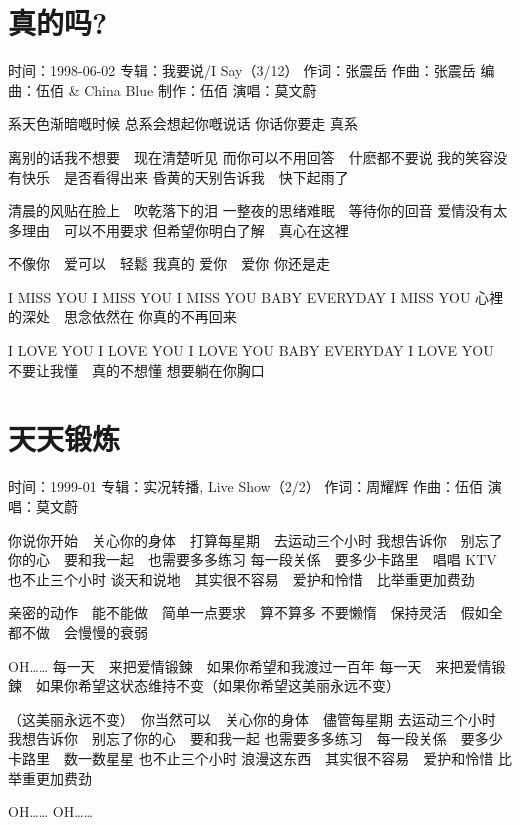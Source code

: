 \documentclass[UTF8,a4paper,oneside,twocolumn,12pt]{ctexbook}
\newcommand{\infopair}[2]{\textbullet #1：#2}
\newcommand{\zc}[1][伍佰]{\infopair{作词}{#1}}
\newcommand{\zq}[1][伍佰]{\infopair{作曲}{#1}}
\newcommand{\bq}[1][伍佰]{\infopair{编曲}{#1}}
\newcommand{\zj}[1]{\infopair{专辑}{#1}}
\newcommand{\zz}[1]{\infopair{制作}{#1}}
\newcommand{\sj}[1]{\infopair{时间}{#1}}
\newenvironment{info}{\begin{flushleft}\kaishu
	}
	{\end{flushleft}\normalsize\yahei\par}
\newenvironment{lyric}{
	}
{}
\begin{document}
\section{真的吗?}
\begin{info}
	\sj{1998-06-02}
	\zj{我要说/I Say（3/12）}
	\zc[张震岳]
	\zq[张震岳]
	\bq[伍佰 \& China Blue]
	\zz{伍佰}
	\infopair{演唱}{莫文蔚}
\end{info}
\begin{lyric}
	系天色渐暗嘅时候 总系会想起你嘅说话
	你话你要走 真系

	离别的话我不想要　现在清楚听见
	而你可以不用回答　什麽都不要说
	我的笑容没有快乐　是否看得出来
	昏黄的天别告诉我　快下起雨了

	清晨的风贴在脸上　吹乾落下的泪
	一整夜的思绪难眠　等待你的回音
	爱情没有太多理由　可以不用要求
	但希望你明白了解　真心在这裡

	不像你　爱可以　轻鬆
	我真的 爱你　爱你  你还是走

	I MISS YOU  I MISS YOU  I MISS YOU
	BABY EVERYDAY I MISS YOU
	心裡的深处　思念依然在  你真的不再回来

	I LOVE YOU  I LOVE YOU  I LOVE YOU
	BABY EVERYDAY I LOVE YOU
	不要让我懂　真的不想懂  想要躺在你胸口
\end{lyric}

\section{天天锻炼}
\begin{info}
	\sj{1999-01}
	\zj{实况转播, Live Show（2/2）}
	\zc[周耀辉]
	\zq
	\infopair{演唱}{莫文蔚}
\end{info}
\begin{lyric}
	你说你开始　关心你的身体　打算每星期　去运动三个小时
	我想告诉你　别忘了你的心　要和我一起　也需要多多练习
	每一段关係　要多少卡路里　唱唱 KTV  也不止三个小时
	谈天和说地　其实很不容易　爱护和怜惜　比举重更加费劲

	亲密的动作　能不能做　简单一点要求　算不算多
	不要懒惰　保持灵活　假如全都不做　会慢慢的衰弱

	OH…… 每一天　来把爱情锻鍊　如果你希望和我渡过一百年
	每一天　来把爱情锻鍊　如果你希望这状态维持不变（如果你希望这美丽永远不变）

	（这美丽永远不变）　你当然可以　关心你的身体　儘管每星期
	去运动三个小时　我想告诉你　别忘了你的心　要和我一起
	也需要多多练习　每一段关係　要多少卡路里　数一数星星
	也不止三个小时  浪漫这东西　其实很不容易　爱护和怜惜
	比举重更加费劲

	OH……  OH……
\end{lyric}
\end{document}
